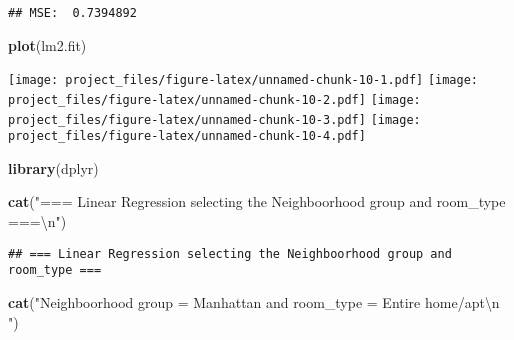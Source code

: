\documentclass[
]{article}
\newenvironment{Shaded}{\begin{snugshade}}{\end{snugshade}}
\newcommand{\CharTok}[1]{\textcolor[rgb]{0.31,0.60,0.02}{#1}}
\newcommand{\DecValTok}[1]{\textcolor[rgb]{0.00,0.00,0.81}{#1}}
\newcommand{\KeywordTok}[1]{\textcolor[rgb]{0.13,0.29,0.53}{\textbf{#1}}}
\newcommand{\NormalTok}[1]{#1}
\newcommand{\OperatorTok}[1]{\textcolor[rgb]{0.81,0.36,0.00}{\textbf{#1}}}
\newcommand{\StringTok}[1]{\textcolor[rgb]{0.31,0.60,0.02}{#1}}
\begin{document}
\begin{Shaded}
\end{Shaded}

\begin{verbatim}
## MSE:  0.7394892
\end{verbatim}

\begin{Shaded}
\begin{Highlighting}[]
\KeywordTok{plot}\NormalTok{(lm2.fit)}
\end{Highlighting}
\end{Shaded}

\texttt{[image: project\_files/figure-latex/unnamed-chunk-10-1.pdf]}
\texttt{[image: project\_files/figure-latex/unnamed-chunk-10-2.pdf]}
\texttt{[image: project\_files/figure-latex/unnamed-chunk-10-3.pdf]}
\texttt{[image: project\_files/figure-latex/unnamed-chunk-10-4.pdf]}

\begin{Shaded}
\begin{Highlighting}[]
\KeywordTok{library}\NormalTok{(dplyr)}

\KeywordTok{cat}\NormalTok{(}\StringTok{"=== Linear Regression selecting the Neighboorhood group and room_type ===}\CharTok{\textbackslash{}n}\StringTok{"}\NormalTok{)}
\end{Highlighting}
\end{Shaded}

\begin{verbatim}
## === Linear Regression selecting the Neighboorhood group and room_type ===
\end{verbatim}

\begin{Shaded}
\begin{Highlighting}[]
\KeywordTok{cat}\NormalTok{(}\StringTok{"Neighboorhood group = Manhattan and room_type = Entire home/apt}\CharTok{\textbackslash{}n}\StringTok{ "}\NormalTok{)}
\end{Highlighting}
\end{Shaded}
\end{document}
